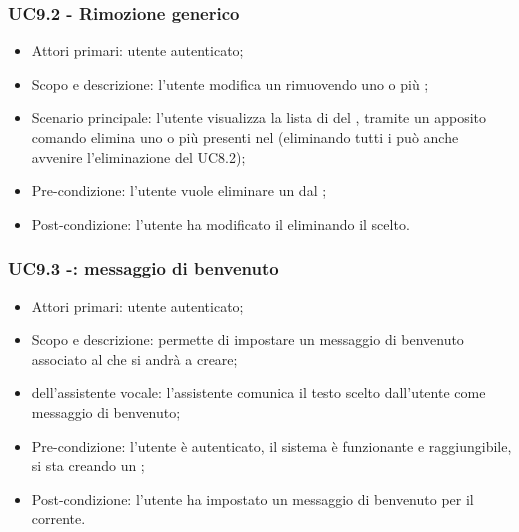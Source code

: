 \subsubsection{UC9.2 - Rimozione  generico}
\begin{itemize}
	\item  Attori primari: utente autenticato;
	\item  Scopo e descrizione: l'utente modifica un  rimuovendo uno o più ;
	\item  Scenario principale: l'utente visualizza la lista di  del , tramite un apposito comando elimina uno o più  presenti nel  (eliminando tutti i  può anche avvenire l'eliminazione del  UC8.2);
	\item  Pre-condizione: l'utente vuole eliminare un  dal ;
	\item  Post-condizione: l'utente ha modificato il  eliminando il  scelto.
\end{itemize}
\subsubsection{UC9.3 -: messaggio di benvenuto}
\begin{itemize}
	\item  Attori primari: utente autenticato;
	\item  Scopo e descrizione: permette di impostare un messaggio di benvenuto associato al  che si andrà a creare;
	\item  {} dell'assistente vocale: l'assistente comunica il testo scelto dall'utente come messaggio di benvenuto;
	\item  Pre-condizione: l'utente è autenticato, il sistema è funzionante e raggiungibile, si sta creando un ;
	\item  Post-condizione: l'utente ha impostato un messaggio di benvenuto per il  corrente.
\end{itemize}

